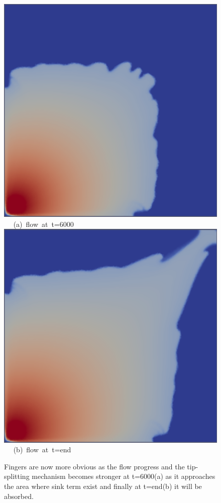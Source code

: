 \begin{figure}[ht]
\vbox{
\hbox{\hspace{2.5cm}
\includegraphics[width=.6\textwidth]{./Pics1/Saffman_homogeneous/saffman_homo_fixed_6000.pdf} 
}
\vspace{0.0cm}
\hbox{\hspace{5.0cm} (a) flow at t=6000   
}
\vspace{0.25cm}
\hbox{\hspace{2.5cm}
\includegraphics[width=.6\textwidth]{./Pics1/Saffman_homogeneous/saffman_homo_fixed_end_1.pdf}
}
\vspace{0.0cm}
\hbox{\hspace{5.0cm} (b) flow at t=end   
}
}     
\caption{Fingers are now more obvious as the flow progress and the tip-splitting mechanism becomes stronger at t=6000(a) as it approaches the area where sink term exist and finally at t=end(b) it will be absorbed.}
\label{fig:2c_homoheleshaw_10}
\end{figure}
\clearpage

